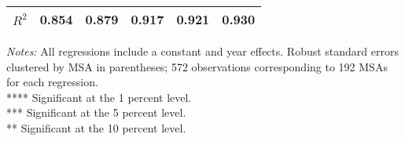 \begin{table}[htbp]
\begin{tabular}{l*{5}{c}}
\(R^{2}\)           &       0.854         &       0.879         &       0.917         &       0.921         &       0.930         \\
\hline\hline
\end{tabular}
\begin{flushleft}
\emph{Notes:} All regressions include a constant and year effects. Robust standard errors clustered by MSA in parentheses; 572 observations corresponding to 192 MSAs for each regression. \\         **** Significant at the 1 percent level. \\         *** Significant at the 5 percent level. \\         ** Significant at the 10 percent level.
\end{flushleft}
\end{table}
